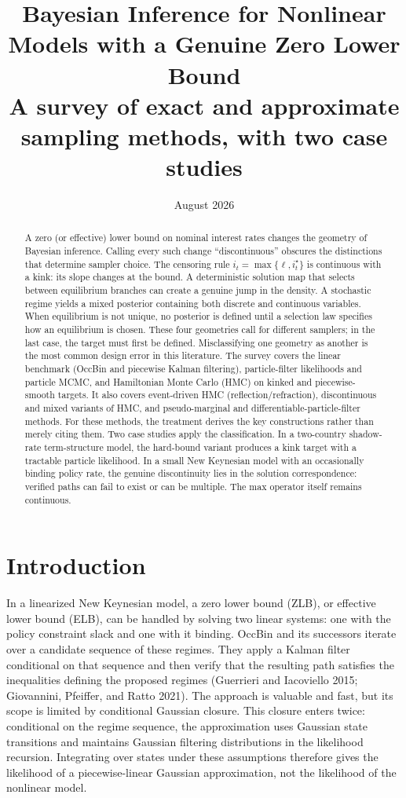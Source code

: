 \documentclass[11pt]{article}
\title{Bayesian Inference for Nonlinear Models with a Genuine Zero Lower
Bound\\[0.6ex]\large A survey of exact and approximate sampling methods,
with two case studies}
\author{}
\date{August 2026}
\begin{document}
\maketitle

\begin{abstract}
\noindent
A zero (or effective) lower bound on nominal interest rates changes the geometry of Bayesian inference. Calling every such change ``discontinuous'' obscures the distinctions that determine sampler choice. The censoring rule $i_t=\max\{\ell,i_t^\star\}$ is continuous with a kink: its slope changes at the bound. A deterministic solution map that selects between equilibrium branches can create a genuine jump in the density. A stochastic regime yields a mixed posterior containing both discrete and continuous variables. When equilibrium is not unique, no posterior is defined until a selection law specifies how an equilibrium is chosen. These four geometries call for different samplers; in the last case, the target must first be defined. Misclassifying one geometry as another is the most common design error in this literature. The survey covers the linear benchmark (OccBin and piecewise Kalman filtering), particle-filter likelihoods and particle MCMC, and Hamiltonian Monte Carlo (HMC) on kinked and piecewise-smooth targets. It also covers event-driven HMC (reflection/refraction), discontinuous and mixed variants of HMC, and pseudo-marginal and differentiable-particle-filter methods. For these methods, the treatment derives the key constructions rather than merely citing them. Two case studies apply the classification. In a two-country shadow-rate term-structure model, the hard-bound variant produces a kink target with a tractable particle likelihood. In a small New Keynesian model with an occasionally binding policy rate, the genuine discontinuity lies in the solution correspondence: verified paths can fail to exist or can be multiple. The max operator itself remains continuous.
\end{abstract}

\tableofcontents
\newpage

\section{Introduction}\label{sec:intro}

In a linearized New Keynesian model, a zero lower bound (ZLB), or effective lower bound (ELB), can be handled by solving two linear systems: one with the policy constraint slack and one with it binding. OccBin and its successors iterate over a candidate sequence of these regimes. They apply a Kalman filter conditional on that sequence and then verify that the resulting path satisfies the inequalities defining the proposed regimes (Guerrieri and Iacoviello 2015; Giovannini, Pfeiffer, and Ratto 2021). The approach is valuable and fast, but its scope is limited by conditional Gaussian closure. This closure enters twice: conditional on the regime sequence, the approximation uses Gaussian state transitions and maintains Gaussian filtering distributions in the likelihood recursion. Integrating over states under these assumptions therefore gives the likelihood of a piecewise-linear Gaussian approximation, not the likelihood of the nonlinear model.
\end{document}
